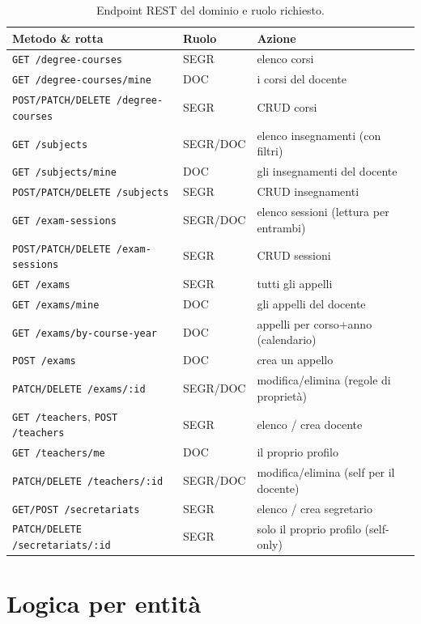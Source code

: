 \documentclass[11pt,a4paper,oneside]{report}
\newcommand{\code}[1]{\texttt{\small #1}}
\begin{document}
\begin{table}[h]
\centering
\small
\renewcommand{\arraystretch}{1.15}
\begin{tabularx}{\linewidth}{@{}llX@{}}
\toprule
\textbf{Metodo \& rotta} & \textbf{Ruolo} & \textbf{Azione} \\
\midrule
\code{GET /degree-courses}        & SEGR & elenco corsi \\
\code{GET /degree-courses/mine}   & DOC  & i corsi del docente \\
\code{POST/PATCH/DELETE /degree-courses} & SEGR & CRUD corsi \\
\code{GET /subjects}              & SEGR/DOC & elenco insegnamenti (con filtri) \\
\code{GET /subjects/mine}         & DOC  & gli insegnamenti del docente \\
\code{POST/PATCH/DELETE /subjects}& SEGR & CRUD insegnamenti \\
\code{GET /exam-sessions}         & SEGR/DOC & elenco sessioni (lettura per entrambi) \\
\code{POST/PATCH/DELETE /exam-sessions} & SEGR & CRUD sessioni \\
\code{GET /exams}                 & SEGR & tutti gli appelli \\
\code{GET /exams/mine}            & DOC  & gli appelli del docente \\
\code{GET /exams/by-course-year}  & DOC  & appelli per corso+anno (calendario) \\
\code{POST /exams}                & DOC  & crea un appello \\
\code{PATCH/DELETE /exams/:id}    & SEGR/DOC & modifica/elimina (regole di proprietà) \\
\code{GET /teachers}, \code{POST /teachers} & SEGR & elenco / crea docente \\
\code{GET /teachers/me}           & DOC  & il proprio profilo \\
\code{PATCH/DELETE /teachers/:id} & SEGR/DOC & modifica/elimina (self per il docente) \\
\code{GET/POST /secretariats}     & SEGR & elenco / crea segretario \\
\code{PATCH/DELETE /secretariats/:id} & SEGR & solo il proprio profilo (self-only) \\
\bottomrule
\end{tabularx}
\caption{Endpoint REST del dominio e ruolo richiesto.}
\end{table}

\section{Logica per entità}
\end{document}
